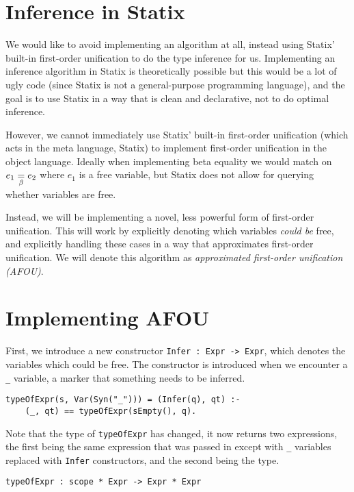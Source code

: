 \section{Inference in Statix}
\label{statix-inference}

We would like to avoid implementing an algorithm at all, instead using Statix' built-in first-order unification to do the type inference for us. Implementing an inference algorithm in Statix is theoretically possible but this would be a lot of ugly code (since Statix is not a general-purpose programming language), and the goal is to use Statix in a way that is clean and declarative, not to do optimal inference.

However, we cannot immediately use Statix' built-in first-order unification (which acts in the meta language, Statix) to implement first-order unification in the object language. Ideally when implementing beta equality we would match on $e_1 \underset{\beta}{=} e_2$ where $e_1$ is a free variable, but Statix does not allow for querying whether variables are free. 

Instead, we will be implementing a novel, less powerful form of first-order unification. This will work by explicitly denoting which variables \emph{could be} free, and explicitly handling these cases in a way that approximates first-order unification. We will denote this algorithm as \emph{approximated first-order unification (AFOU)}.

\section{Implementing AFOU}
\label{implementing-inference}

First, we introduce a new constructor \verb|Infer : Expr -> Expr|, which denotes the variables which could be free. The constructor is introduced when we encounter a \verb|_| variable, a marker that something needs to be inferred.
\begin{lstlisting}
typeOfExpr(s, Var(Syn("_"))) = (Infer(q), qt) :-
	(_, qt) == typeOfExpr(sEmpty(), q).
\end{lstlisting}

Note that the type of \verb|typeOfExpr| has changed, it now returns two expressions, the first being the same expression that was passed in except with \verb|_| variables replaced with \verb|Infer| constructors, and the second being the type.
\begin{lstlisting}
typeOfExpr : scope * Expr -> Expr * Expr
\end{lstlisting}



